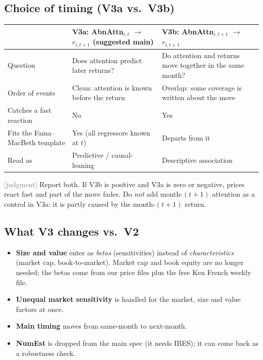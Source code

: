 \documentclass[11pt]{article}
\newcommand{\judg}{\textcolor{Gray}{\textsf{[judgment]}}}
\begin{document}
\subsection*{Choice of timing (V3a vs.\ V3b)}
\begin{center}\small
\begin{tabularx}{\textwidth}{>{\raggedright}p{3.0cm} >{\raggedright}X >{\raggedright\arraybackslash}X}
\toprule
 & \textbf{V3a: AbnAttn$_{i,t}$ $\rightarrow$ $r_{i,t+1}$} (suggested main) & \textbf{V3b: AbnAttn$_{i,t+1}$ $\rightarrow$ $r_{i,t+1}$}\\
\midrule
Question & Does attention predict later returns? & Do attention and returns move together in the same month?\\
Order of events & Clean: attention is known before the return & Overlap: some coverage is written about the move\\
Catches a fast reaction & No & Yes\\
Fits the Fama--MacBeth template & Yes (all regressors known at $t$) & Departs from it\\
Read as & Predictive / causal-leaning & Descriptive association\\
\bottomrule
\end{tabularx}
\end{center}
\judg{} Report both. If V3b is positive and V3a is zero or negative, prices react fast and part of the move fades. Do \emph{not} add month-$(t{+}1)$ attention as a control in V3a: it is partly caused by the month-$(t{+}1)$ return.

\subsection*{What V3 changes vs.\ V2}
\begin{itemize}
  \item \textbf{Size and value} enter as \emph{betas} (sensitivities) instead of \emph{characteristics} (market cap, book-to-market). Market cap and book equity are no longer needed; the betas come from our price files plus the free Ken French weekly file.
  \item \textbf{Unequal market sensitivity} is handled for the market, size and value factors at once.
  \item \textbf{Main timing} moves from same-month to next-month.
  \item \textbf{NumEst} is dropped from the main spec (it needs IBES); it can come back as a robustness check.
\end{itemize}
\end{document}
